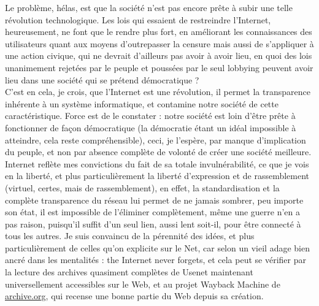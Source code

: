 \documentclass[12pt,a4paper]{article}
\begin{document}
{Le problème, hélas, est que la société n'est pas encore prête à subir une telle révolution technologique. Les lois qui essaient de restreindre l'Internet, heureusement, ne font que le rendre plus fort, en améliorant les connaissances des utilisateurs quant aux moyens d'outrepasser la censure mais aussi de s'appliquer à une action civique, qui ne devrait d'ailleurs pas avoir à avoir lieu, en quoi des lois unanimement rejetées par le peuple et poussées par le seul lobbying peuvent avoir lieu dans une société qui se prétend démocratique ?\\

C'est en cela, je crois, que l'Internet est une révolution, il permet la transparence inhérente à un système informatique, et contamine notre société de cette caractéristique. Force est de le constater : notre société est loin d'être prête à fonctionner de façon démocratique (la démocratie étant un idéal impossible à atteindre, cela reste compréhensible), ceci, je l'espère, par manque d'implication du peuple, et non par absence complète de volonté de créer une société meilleure.\\

Internet reflète mes convictions du fait de sa totale invulnérabilité, ce que je vois en la liberté, et plus particulièrement la liberté d'expression et de rassemblement (\og{}virtuel\fg{}, certes, mais de rassemblement), en effet, la standardisation et la complète transparence du réseau lui permet de ne jamais sombrer, peu importe son état, il est impossible de l'éliminer complètement, même une guerre n'en a pas raison, puisqu'il suffit d'un seul lien, aussi lent soit-il, pour être connecté à tous les autres. Je suis convaincu de la pérennité des idées, et plus particulièrement de celles qu'on explicite sur le Net, car selon un vieil adage bien ancré dans les mentalités : \og{}the Internet never forgets\fg{}, et cela peut se vérifier par la lecture des archives quasiment complètes de Usenet maintenant universellement accessibles sur le Web, et au projet Wayback Machine de \url{archive.org}, qui recense une bonne partie du Web depuis sa création.\\

}
\end{document}
